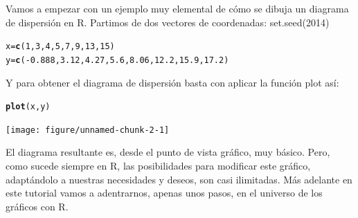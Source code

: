 \documentclass[10pt,a4paper]{article}\usepackage[]{graphicx}\usepackage[]{color}
\makeatletter
\newcommand{\hlnum}[1]{\textcolor[rgb]{0.686,0.059,0.569}{#1}}%
\newcommand{\hlopt}[1]{\textcolor[rgb]{0,0,0}{#1}}%
\newcommand{\hlstd}[1]{\textcolor[rgb]{0.345,0.345,0.345}{#1}}%
\newcommand{\hlkwb}[1]{\textcolor[rgb]{0.69,0.353,0.396}{#1}}%
\newcommand{\hlkwd}[1]{\textcolor[rgb]{0.737,0.353,0.396}{\textbf{#1}}}%
\newenvironment{kframe}{%
 \def\at@end@of@kframe{}%
 \ifinner\ifhmode%
  \def\at@end@of@kframe{\end{minipage}}%
  \begin{minipage}{\columnwidth}%
 \fi\fi%
 \def\FrameCommand##1{\hskip\@totalleftmargin \hskip-\fboxsep
 \colorbox{shadecolor}{##1}\hskip-\fboxsep
     \hskip-\linewidth \hskip-\@totalleftmargin \hskip\columnwidth}%
 \MakeFramed {\advance\hsize-\width
   \@totalleftmargin\z@ \linewidth\hsize
   \@setminipage}}%
 {\par\unskip\endMakeFramed%
 \at@end@of@kframe}
\newenvironment{knitrout}{}{} %
\makeatother
\begin{document}
Vamos a empezar con un ejemplo muy elemental de cómo se dibuja un diagrama de dispersión en R. Partimos de dos vectores de coordenadas:
set.seed(2014)
\begin{knitrout}
\color{fgcolor}\begin{kframe}
\begin{alltt}
\hlstd{x} \hlkwb{=} \hlkwd{c}\hlstd{(}\hlnum{1}\hlstd{,} \hlnum{3}\hlstd{,} \hlnum{4}\hlstd{,} \hlnum{5}\hlstd{,} \hlnum{7}\hlstd{,} \hlnum{9}\hlstd{,} \hlnum{13}\hlstd{,} \hlnum{15}\hlstd{)}
\hlstd{y} \hlkwb{=} \hlkwd{c}\hlstd{(}\hlopt{-}\hlnum{0.888}\hlstd{,} \hlnum{3.12}\hlstd{,} \hlnum{4.27}\hlstd{,} \hlnum{5.6}\hlstd{,} \hlnum{8.06}\hlstd{,} \hlnum{12.2}\hlstd{,} \hlnum{15.9}\hlstd{,} \hlnum{17.2}\hlstd{)}
\end{alltt}
\end{kframe}
\end{knitrout}
Y para obtener el diagrama de dispersión basta con aplicar la función {\sf plot} así:
\begin{knitrout}
\color{fgcolor}\begin{kframe}
\begin{alltt}
\hlkwd{plot}\hlstd{(x, y)}
\end{alltt}
\end{kframe}
\texttt{[image: figure/unnamed-chunk-2-1]} 

\end{knitrout}
El diagrama resultante es, desde el punto de vista gráfico, muy básico. Pero, como sucede siempre en R, las posibilidades para modificar este gráfico, adaptándolo a nuestras necesidades y deseos, son casi ilimitadas. Más adelante en este tutorial vamos a adentrarnos, apenas unos pasos, en el universo de los gráficos con R.
\end{document}
